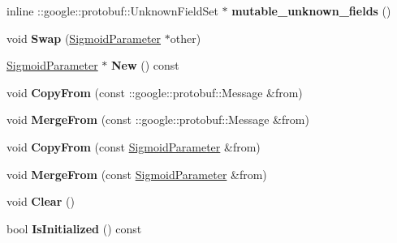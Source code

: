 \begin{DoxyCompactItemize}
inline \+::google\+::protobuf\+::\+Unknown\+Field\+Set $\ast$ {\bfseries mutable\+\_\+unknown\+\_\+fields} ()
\item 
\mbox{\label{classcaffe_1_1_sigmoid_parameter_af826ea89c392763d2693c914cead44c5}} 
void {\bfseries Swap} (\mbox{\hyperlink{classcaffe_1_1_sigmoid_parameter}{Sigmoid\+Parameter}} $\ast$other)
\item 
\mbox{\label{classcaffe_1_1_sigmoid_parameter_a8af08406e9d7d8653e9d19549621d71e}} 
\mbox{\hyperlink{classcaffe_1_1_sigmoid_parameter}{Sigmoid\+Parameter}} $\ast$ {\bfseries New} () const
\item 
\mbox{\label{classcaffe_1_1_sigmoid_parameter_afe7eeb728d2d4ba3e101409d0467808b}} 
void {\bfseries Copy\+From} (const \+::google\+::protobuf\+::\+Message \&from)
\item 
\mbox{\label{classcaffe_1_1_sigmoid_parameter_a03aa7e9d0ea2a9b6bf33d1ba875fed04}} 
void {\bfseries Merge\+From} (const \+::google\+::protobuf\+::\+Message \&from)
\item 
\mbox{\label{classcaffe_1_1_sigmoid_parameter_aae51431dc6d1c145f9da03add47da4f8}} 
void {\bfseries Copy\+From} (const \mbox{\hyperlink{classcaffe_1_1_sigmoid_parameter}{Sigmoid\+Parameter}} \&from)
\item 
\mbox{\label{classcaffe_1_1_sigmoid_parameter_a19a1d79ba759ca257aed4e19dd835253}} 
void {\bfseries Merge\+From} (const \mbox{\hyperlink{classcaffe_1_1_sigmoid_parameter}{Sigmoid\+Parameter}} \&from)
\item 
\mbox{\label{classcaffe_1_1_sigmoid_parameter_af24dbe6d1d7fa082cef36b043211e64f}} 
void {\bfseries Clear} ()
\item 
\mbox{\label{classcaffe_1_1_sigmoid_parameter_a14116ae55e9392bc6dc7f9f1c28fb831}} 
bool {\bfseries Is\+Initialized} () const
\item 
\mbox{\label{classcaffe_1_1_sigmoid_parameter_ac1d018158c82fcceedd8e481adc7a54a}} 

\end{DoxyCompactItemize}
